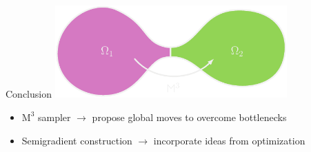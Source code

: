 \documentclass[mathserif]{beamer}
\begin{document}
\begin{frame}{Conclusion}
\vspace{1em}
\centering
\includegraphics[width=3.5in]{figures/bottleneck_conclusion.pdf}

\vspace{1em}
\begin{itemize}
  \item $\mathrm{M}^3$ sampler $\rightarrow$ propose global moves to overcome bottlenecks
  \vspace{0.5em}
  \item Semigradient construction $\rightarrow$ incorporate ideas from optimization
\end{itemize}

\vspace{1em}

\end{frame}
\end{document}
